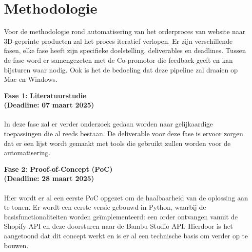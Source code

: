 
\section{Methodologie}%
\label{sec:methodologie}

Voor de methodologie rond automatisering van het orderproces van website naar 3D-geprinte producten zal het proces iteratief verlopen. Er zijn verschillende fasen, elke fase heeft zijn specifieke doelstelling, deliverables en deadlines. Tussen de fase word er samengezeten met de Co-promotor die feedback geeft en kan bijsturen waar nodig. Ook is het de bedoeling dat deze pipeline zal draaien op Mac en Windows.
\vspace{2em}

\textbf{Fase 1: Literatuurstudie}\\
\textbf{(Deadline: 07 maart 2025)}\\\\
In deze fase zal er verder onderzoek gedaan worden naar gelijkaardige toepassingen die al reeds bestaan. De deliverable voor deze fase is ervoor zorgen dat er een lijst wordt gemaakt met tools die gebruikt zullen worden voor de automatisering.
\vspace{2em}

\textbf{Fase 2: Proof-of-Concept (PoC)}\\
\textbf{(Deadline: 28 maart 2025)}\\\\
Hier wordt er al een eerste PoC opgezet om de haalbaarheid van de oplossing aan te tonen. Er wordt een eerste versie gebouwd in Python, waarbij de basisfunctionaliteiten worden geïmplementeerd: een order ontvangen vanuit de Shopify API en deze doorsturen naar de Bambu Studio API. Hierdoor is het aangetoond dat dit concept werkt en is er al een technische basis om verder op te bouwen.
\vspace{1em}

